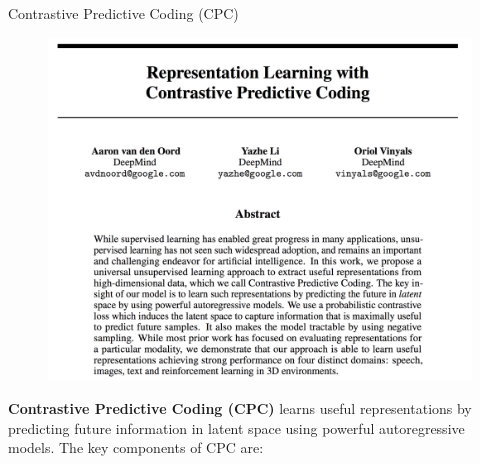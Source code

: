 \begin{frame}[allowframebreaks]{Contrastive Predictive Coding (CPC)}
    \begin{figure}
        \centering
        \includegraphics[width=1\linewidth,height=0.9\textheight,keepaspectratio]{images/ssl/slide_44_1_img.png}
    \end{figure}

    \framebreak

    \textbf{Contrastive Predictive Coding (CPC)} learns useful representations by predicting future information in latent space using powerful autoregressive models. The key components of CPC are:


\end{frame}
